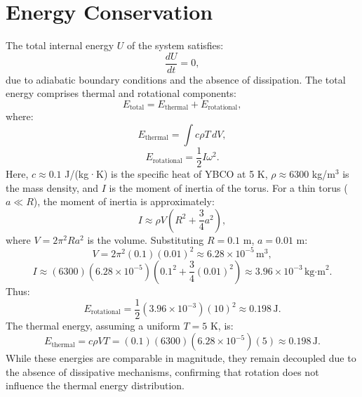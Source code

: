 \documentclass[12pt]{article}
\begin{document}
\section{Energy Conservation}
The total internal energy $U$ of the system satisfies:
\begin{equation}
    \frac{dU}{dt} = 0,
\end{equation}
due to adiabatic boundary conditions and the absence of dissipation. The total energy comprises thermal and rotational components:
\begin{equation}
    E_{\text{total}} = E_{\text{thermal}} + E_{\text{rotational}},
\end{equation}
where:
\begin{equation}
    E_{\text{thermal}} = \int c \rho T \, dV,
\end{equation}
\begin{equation}
    E_{\text{rotational}} = \frac{1}{2} I \omega^2.
\end{equation}
Here, $c \approx 0.1$ J/(kg·K) is the specific heat of YBCO at 5 K, $\rho \approx 6300$ kg/m$^3$ is the mass density, and $I$ is the moment of inertia of the torus. For a thin torus ($a \ll R$), the moment of inertia is approximately:
\begin{equation}
    I \approx \rho V (R^2 + \frac{3}{4} a^2),
\end{equation}
where $V = 2 \pi^2 R a^2$ is the volume. Substituting $R = 0.1$ m, $a = 0.01$ m:
\begin{equation}
    V = 2 \pi^2 (0.1) (0.01)^2 \approx 6.28 \times 10^{-5} \, \text{m}^3,
\end{equation}
\begin{equation}
    I \approx (6300) (6.28 \times 10^{-5}) (0.1^2 + \frac{3}{4} (0.01)^2) \approx 3.96 \times 10^{-3} \, \text{kg·m}^2.
\end{equation}
Thus:
\begin{equation}
    E_{\text{rotational}} = \frac{1}{2} (3.96 \times 10^{-3}) (10)^2 \approx 0.198 \, \text{J}.
\end{equation}
The thermal energy, assuming a uniform $T = 5$ K, is:
\begin{equation}
    E_{\text{thermal}} = c \rho V T = (0.1) (6300) (6.28 \times 10^{-5}) (5) \approx 0.198 \, \text{J}.
\end{equation}
While these energies are comparable in magnitude, they remain decoupled due to the absence of dissipative mechanisms, confirming that rotation does not influence the thermal energy distribution.
\end{document}
